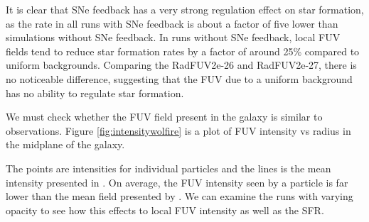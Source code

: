 It is clear that SNe feedback has a very strong regulation effect on star formation, as the rate in all runs with SNe feedback is about a factor of five lower than simulations without SNe feedback. In runs without SNe feedback, local FUV fields tend to reduce star formation rates by a factor of around 25\% compared to uniform backgrounds. Comparing the RadFUV2e-26 and RadFUV2e-27, there is no noticeable difference, suggesting that the FUV due to a uniform background has no ability to regulate star formation.

We must check whether the FUV field present in the galaxy is similar to observations. Figure \ref{fig:intensitywolfire} is a plot of FUV intensity vs radius in the midplane of the galaxy.


The points are intensities for individual particles and the lines is the mean intensity presented in \citet{wolfireEt03}. On average, the FUV intensity seen by a particle is far lower than the mean field presented by \citet{wolfireEt03}. We can examine the runs with varying opacity to see how this effects to local FUV intensity as well as the SFR.


